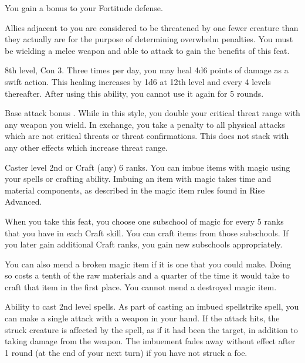 You gain a  bonus to your Fortitude defense.

 Allies adjacent to you are considered to be threatened by one fewer creature than they actually are for the purpose of determining overwhelm penalties. You must be wielding a melee weapon and able to attack to gain the benefits of this feat.

\featpre 8th level, Con 3.
\featben Three times per day, you may heal 4d6 points of damage as a swift action. This healing increases by 1d6 at 12th level and every 4 levels thereafter. After using this ability, you cannot use it again for 5 rounds.

 Base attack bonus .
 While in this style, you double your critical threat range with any weapon you wield. In exchange, you take a  penalty to all physical attacks which are not critical threats or threat confirmations. This does not stack with any other effects which increase threat range.

 Caster level 2nd or Craft (any) 6 ranks.
 You can imbue items with magic using your spells or crafting ability. Imbuing an item with magic takes time and material components, as described in the magic item rules found in Rise Advanced.

When you take this feat, you choose one subschool of magic for every 5 ranks that you have in each Craft skill. You can craft items from those subschools. If you later gain additional Craft ranks, you gain new subschools appropriately.

You can also mend a broken magic item if it is one that you could make. Doing so costs a tenth of the raw materials and a quarter of the time it would take to craft that item in the first place. You cannot mend a destroyed magic item.

 Ability to cast 2nd level spells.
 As part of casting an imbued spellstrike spell, you can make a single attack with a weapon in your hand. If the attack hits, the struck creature is affected by the spell, as if it had been the target, in addition to taking damage from the weapon. The imbuement fades away without effect after 1 round (at the end of your next turn) if you have not struck a foe.

